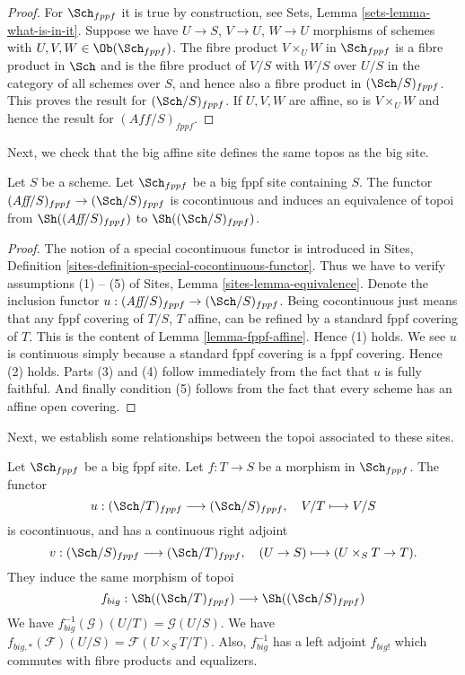 \begin{proof}
For $\Sch_{fppf}$ it is true by construction, see
Sets, Lemma \ref{sets-lemma-what-is-in-it}.
Suppose we have $U \to S$, $V \to U$, $W \to U$ morphisms
of schemes with $U, V, W \in \Ob(\Sch_{fppf})$.
The fibre product $V \times_U W$ in $\Sch_{fppf}$
is a fibre product in $\Sch$ and
is the fibre product of $V/S$ with $W/S$ over $U/S$ in
the category of all schemes over $S$, and hence also a
fibre product in $(\Sch/S)_{fppf}$.
This proves the result for $(\Sch/S)_{fppf}$.
If $U, V, W$ are affine, so is $V \times_U W$ and hence the
result for $(\textit{Aff}/S)_{fppf}$.
\end{proof}

\noindent
Next, we check that the big affine site defines the same
topos as the big site.

\begin{lemma}
\label{lemma-affine-big-site-fppf}
Let $S$ be a scheme. Let $\Sch_{fppf}$ be a big fppf
site containing $S$.
The functor $(\textit{Aff}/S)_{fppf} \to (\Sch/S)_{fppf}$
is cocontinuous and induces an equivalence of topoi from
$\Sh((\textit{Aff}/S)_{fppf})$ to
$\Sh((\Sch/S)_{fppf})$.
\end{lemma}

\begin{proof}
The notion of a special cocontinuous functor is introduced in
Sites, Definition \ref{sites-definition-special-cocontinuous-functor}.
Thus we have to verify assumptions (1) -- (5) of
Sites, Lemma \ref{sites-lemma-equivalence}.
Denote the inclusion functor
$u : (\textit{Aff}/S)_{fppf} \to (\Sch/S)_{fppf}$.
Being cocontinuous just means that any fppf covering of
$T/S$, $T$ affine, can be refined by a standard fppf covering of $T$.
This is the content of
Lemma \ref{lemma-fppf-affine}.
Hence (1) holds. We see $u$ is continuous simply because a standard
fppf covering is a fppf covering. Hence (2) holds.
Parts (3) and (4) follow immediately from the fact that $u$ is
fully faithful. And finally condition (5) follows from the
fact that every scheme has an affine open covering.
\end{proof}

\noindent
Next, we establish some relationships between the topoi
associated to these sites.

\begin{lemma}
\label{lemma-morphism-big-fppf}
Let $\Sch_{fppf}$ be a big fppf site.
Let $f : T \to S$ be a morphism in $\Sch_{fppf}$.
The functor
$$
u : (\Sch/T)_{fppf} \longrightarrow (\Sch/S)_{fppf},
\quad
V/T \longmapsto V/S
$$
is cocontinuous, and has a continuous right adjoint
$$
v : (\Sch/S)_{fppf} \longrightarrow (\Sch/T)_{fppf},
\quad
(U \to S) \longmapsto (U \times_S T \to T).
$$
They induce the same morphism of topoi
$$
f_{big} :
\Sh((\Sch/T)_{fppf})
\longrightarrow
\Sh((\Sch/S)_{fppf})
$$
We have $f_{big}^{-1}(\mathcal{G})(U/T) = \mathcal{G}(U/S)$.
We have $f_{big, *}(\mathcal{F})(U/S) = \mathcal{F}(U \times_S T/T)$.
Also, $f_{big}^{-1}$ has a left adjoint $f_{big!}$ which commutes with
fibre products and equalizers.
\end{lemma}

